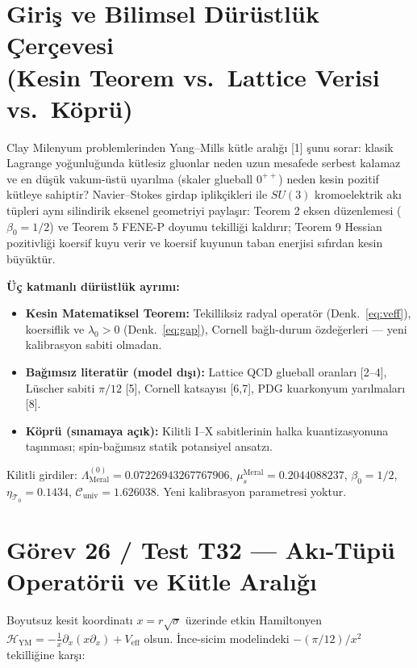 \documentclass[12pt,a4paper]{article}
\begin{document}
\section[Giriş ve Bilimsel Dürüstlük Çerçevesi]{Giriş ve Bilimsel Dürüstlük Çerçevesi \\ (Kesin Teorem vs.\ Lattice Verisi vs.\ Köprü)}

Clay Milenyum problemlerinden Yang--Mills kütle aralığı [1] şunu sorar: klasik
Lagrange yoğunluğunda kütlesiz gluonlar neden uzun mesafede serbest kalamaz ve
en düşük vakum-üstü uyarılma (skaler glueball $0^{++}$) neden kesin pozitif
kütleye sahiptir? Navier--Stokes girdap iplikçikleri ile $SU(3)$ kromoelektrik
akı tüpleri aynı silindirik eksenel geometriyi paylaşır: Teorem 2 eksen
düzenlemesi ($\beta_0=1/2$) ve Teorem 5 FENE-P doyumu tekilliği kaldırır;
Teorem 9 Hessian pozitivliği koersif kuyu verir ve koersif kuyunun taban enerjisi
sıfırdan kesin büyüktür.

\textbf{Üç katmanlı dürüstlük ayrımı:}
\begin{itemize}
    \item \textbf{Kesin Matematiksel Teorem:} Tekilliksiz radyal operatör
    (Denk.~\ref{eq:veff}), koersiflik ve $\lambda_0>0$ (Denk.~\ref{eq:gap}),
    Cornell bağlı-durum özdeğerleri --- yeni kalibrasyon sabiti olmadan.
    \item \textbf{Bağımsız literatür (model dışı):} Lattice QCD glueball
    oranları [2--4], Lüscher sabiti $\pi/12$ [5], Cornell katsayısı [6,7],
    PDG kuarkonyum yarılmaları [8].
    \item \textbf{Köprü (sınamaya açık):} Kilitli I--X
    sabitlerinin halka kuantizasyonuna taşınması; spin-bağımsız statik
    potansiyel ansatzı.
\end{itemize}
Kilitli girdiler: $\Lambda_{\mathrm{Meral}}^{(0)} = 0.07226943267767906$,
$\mu_s^{\mathrm{Meral}} = 0.2044088237$, $\beta_0 = 1/2$,
$\eta_{\mathcal{T}_0} = 0.1434$,
$\mathcal{C}_{\mathrm{univ}} = 1.626038$. Yeni kalibrasyon parametresi yoktur.

\section{Görev 26 / Test T32 --- Akı-Tüpü Operatörü ve Kütle Aralığı}

Boyutsuz kesit koordinatı $x=r\sqrt{\sigma}$ üzerinde etkin Hamiltonyen
$\mathcal{H}_{\mathrm{YM}}=-\frac{1}{x}\partial_x(x\partial_x)+V_{\mathrm{eff}}$
olsun. İnce-sicim modelindeki $-(\pi/12)/x^2$ tekilliğine karşı:
\end{document}
